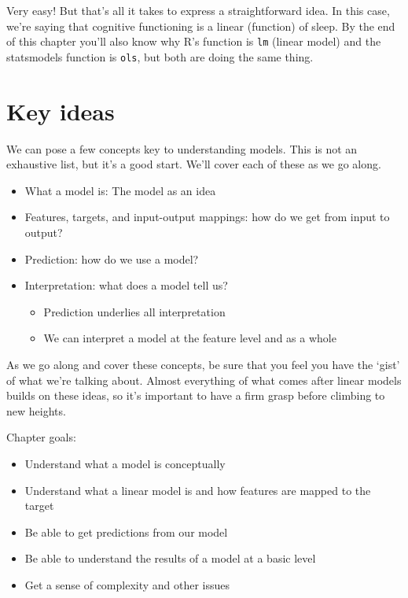 \documentclass[
  letterpaper,
]{krantz}
\providecommand{\tightlist}{%
  \setlength{\itemsep}{0pt}\setlength{\parskip}{0pt}}\usepackage{longtable,booktabs,array}
\begin{document}
Very easy! But that's all it takes to express a straightforward idea. In
this case, we're saying that cognitive functioning is a linear
(function) of sleep. By the end of this chapter you'll also know why R's
function is \texttt{lm} (linear model) and the {statsmodels} function is
\texttt{ols}, but both are doing the same thing.

\section{Key ideas}\label{key-ideas-1}

We can pose a few concepts key to understanding models. This is not an
exhaustive list, but it's a good start. We'll cover each of these as we
go along.

\begin{itemize}
\tightlist
\item
  What a model is: The model as an idea
\item
  Features, targets, and input-output mappings: how do we get from input
  to output?
\item
  Prediction: how do we use a model?
\item
  Interpretation: what does a model tell us?

  \begin{itemize}
  \tightlist
  \item
    Prediction underlies all interpretation
  \item
    We can interpret a model at the feature level and as a whole
  \end{itemize}
\end{itemize}

As we go along and cover these concepts, be sure that you feel you have
the `gist' of what we're talking about. Almost everything of what comes
after linear models builds on these ideas, so it's important to have a
firm grasp before climbing to new heights.

Chapter goals:

\begin{itemize}
\tightlist
\item
  Understand what a model is conceptually
\item
  Understand what a linear model is and how features are mapped to the
  target
\item
  Be able to get predictions from our model
\item
  Be able to understand the results of a model at a basic level
\item
  Get a sense of complexity and other issues
\end{itemize}
\end{document}
